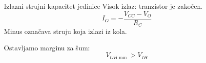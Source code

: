 \begin{frame}[label=10-s023]{Izlazni strujni kapacitet jedinice}
\setlength{\abovedisplayskip}{4pt}\setlength{\belowdisplayskip}{4pt}\setlength{\abovedisplayshortskip}{3pt}\setlength{\belowdisplayshortskip}{3pt}
Visok izlaz: tranzistor je zakočen.
\[I_O=-\frac{V_{CC}-V_O}{R_C}\]
Minus označava struju koja izlazi iz kola.\par\bigskip
Ostavljamo marginu za šum:
\[V_{OH\min}>V_{IH}\]
\end{frame}
